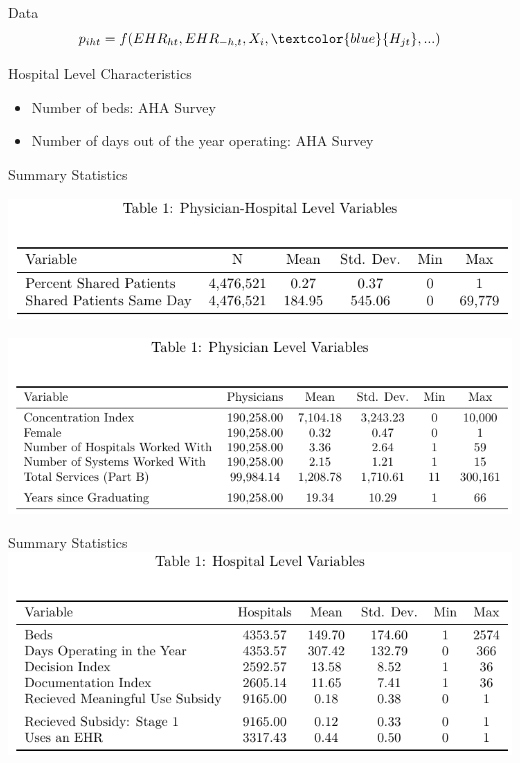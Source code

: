 \documentclass[10pt]{beamer}
\begin{document}
\begin{frame}{Data}
\begin{equation*}
    p_{iht}=f(EHR_{ht},EHR_{-h,t},X_i,\textcolor{blue}{H_{jt}},...)
\end{equation*}

\vspace{5mm}

Hospital Level Characteristics
\begin{itemize}
    \item Number of beds: AHA Survey
    \item Number of days out of the year operating: AHA Survey
\end{itemize}
\end{frame}

\begin{frame}{Summary Statistics}
\centering

\includegraphics[scale=.8]{Objects/sumstats_pair_table.pdf}

\vspace{3mm}

\includegraphics[scale=.8]{Objects/sumstats_physician_table.pdf}

\end{frame}

\begin{frame}{Summary Statistics}
\centering
\includegraphics[scale=.8]{Objects/sumstats_hospital_table.pdf}
    
\end{frame}
\end{document}
